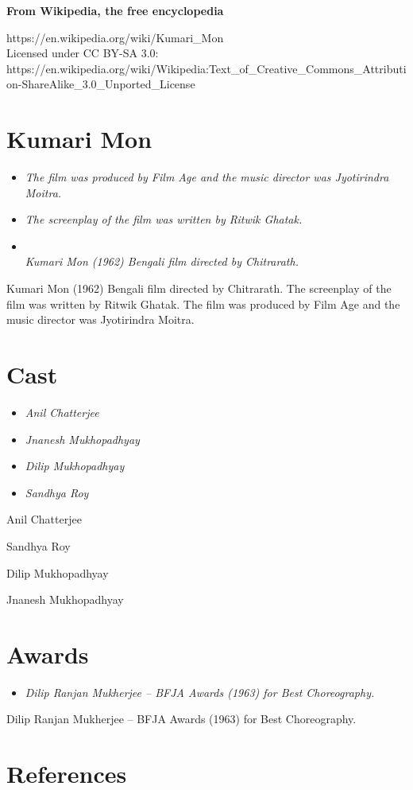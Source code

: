 \textbf{From Wikipedia, the free encyclopedia}

https://en.wikipedia.org/wiki/Kumari\_Mon\\
Licensed under CC BY-SA 3.0:\\
https://en.wikipedia.org/wiki/Wikipedia:Text\_of\_Creative\_Commons\_Attribution-ShareAlike\_3.0\_Unported\_License

\section{Kumari Mon}\label{kumari-mon}

\begin{itemize}
\item
  \emph{The film was produced by Film Age and the music director was
  Jyotirindra Moitra.}
\item
  \emph{The screenplay of the film was written by Ritwik Ghatak.}
\item
  \emph{\\[2\baselineskip]Kumari Mon (1962) Bengali film directed by
  Chitrarath.}
\end{itemize}

Kumari Mon (1962) Bengali film directed by Chitrarath. The screenplay of
the film was written by Ritwik Ghatak. The film was produced by Film Age
and the music director was Jyotirindra Moitra.

\section{Cast}\label{cast}

\begin{itemize}
\item
  \emph{Anil Chatterjee}
\item
  \emph{Jnanesh Mukhopadhyay}
\item
  \emph{Dilip Mukhopadhyay}
\item
  \emph{Sandhya Roy}
\end{itemize}

Anil Chatterjee

Sandhya Roy

Dilip Mukhopadhyay

Jnanesh Mukhopadhyay

\section{Awards}\label{awards}

\begin{itemize}
\item
  \emph{Dilip Ranjan Mukherjee -- BFJA Awards (1963) for Best
  Choreography.}
\end{itemize}

Dilip Ranjan Mukherjee -- BFJA Awards (1963) for Best Choreography.

\section{References}\label{references}
